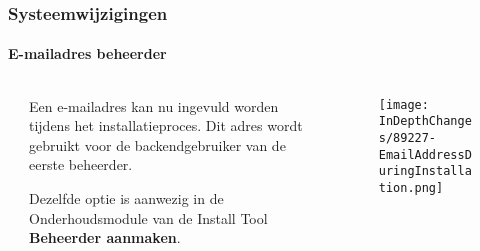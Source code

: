 
\begin{frame}[fragile]
	\frametitle{Systeemwijzigingen}
	\framesubtitle{E-mailadres beheerder}

	\begin{columns}[T]
		\begin{column}{.04\textwidth}
		\end{column}
		\begin{column}{.38\textwidth}

			Een e-mailadres kan nu ingevuld worden tijdens het installatieproces.
			Dit adres wordt gebruikt voor de backendgebruiker van de eerste beheerder.

			\vspace{0.2cm}

			Dezelfde optie is aanwezig in de Onderhoudsmodule van de Install Tool
			\textbf{Beheerder aanmaken}.

		\end{column}
		\begin{column}{.58\textwidth}
			\vspace{-0.3cm}
			\begin{figure}
				\texttt{[image: InDepthChanges/89227-EmailAddressDuringInstallation.png]}
			\end{figure}
		\end{column}
	\end{columns}

\end{frame}



